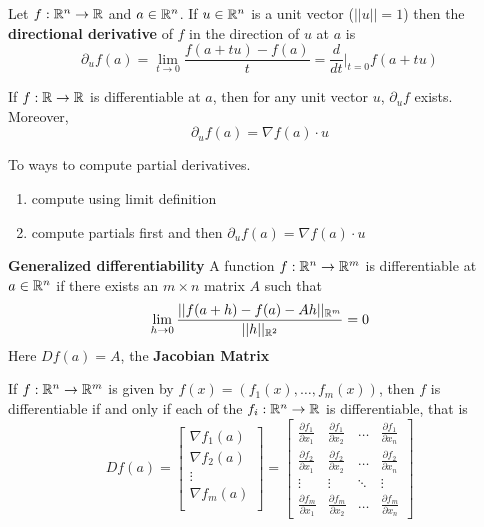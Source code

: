\documentclass[11pt]{article}
\begin{document}
\begin{defn}
  \label{directional derivatives}
  Let $f:\mathbb{R}^n \to \mathbb{R}$ and $a\in\mathbb{R}^n$. If $u\in\mathbb{R}^n$ is a unit vector ($||u||=1$) then the \textbf{directional derivative} of $f$ in the direction of $u$ at $a$ is
  \[
    \partial_u f(a) = \lim_{t\to0} \frac{f(a + tu) - f(a)}{t} = \frac{d}{dt} \vert_{t=0} f(a+tu)
  \]
\end{defn}

\begin{theorem}
  If $f:\mathbb{R} \to\mathbb{R}$ is differentiable at $a$, then for any unit vector $u$, $\partial_u f$ exists. Moreover,
  \[
    \partial_u f(a) = \nabla f(a) \cdot u
  \]
\end{theorem}

\begin{rem}
  To ways to compute partial derivatives.
  \begin{enumerate}
    \item compute using limit definition
    \item compute partials first and then $\partial_u f(a) = \nabla f(a) \cdot u$
  \end{enumerate}
\end{rem}

\begin{defn}
  \label{generalized differentiability}
  \textbf{Generalized differentiability} A function $f: \mathbb{R}^n \to \mathbb{R}^m$ is differentiable at $a\in \mathbb{R}^n$ if there exists an $m\times n$ matrix $A$ such that
  \[
    \lim_{h\to 0} \frac{|| f(a+h) - f(a) - Ah ||_{\mathbb{R}^m}}{||h||_{\mathbb{R}^2}} = 0
  \]
  Here $Df(a) = A$, the \textbf{Jacobian Matrix}
\end{defn}

\begin{proposition}
  \label{the jacobian matrix}
  If $f:\mathbb{R}^n \to \mathbb{R}^m$ is given by $f(x) = (f_1(x), \dots, f_m(x))$, then $f$ is differentiable if and only if each of the $f_i:\mathbb{R}^n\to \mathbb{R}$ is differentiable, that is
  \[
    Df(a) =
      \begin{bmatrix}
        \nabla f_1(a)\\
        \nabla f_2(a)\\
        \vdots\\
        \nabla f_m(a)\\
      \end{bmatrix}
      =
      \begin{bmatrix}
        \frac{\partial f_1}{\partial x_1} & \frac{\partial f_1}{\partial x_2} & \dots  & \frac{\partial f_1}{\partial x_n} \\
        \frac{\partial f_2}{\partial x_1} & \frac{\partial f_2}{\partial x_2} & \dots  & \frac{\partial f_2}{\partial x_n} \\
        \vdots & \vdots & \ddots & \vdots \\
        \frac{\partial f_m}{\partial x_1} & \frac{\partial f_m}{\partial x_2} & \dots  & \frac{\partial f_m}{\partial x_n}
      \end{bmatrix}
  \]
\end{proposition}
\end{document}
